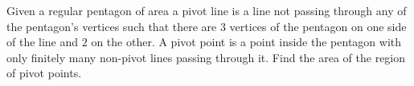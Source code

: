 Given a regular pentagon of area  a pivot line is a line not passing through any of the pentagon's vertices such that there are $3$ vertices of the pentagon on one side of the line and $2$ on the other. A pivot point is a point inside the pentagon with only finitely many non-pivot lines passing through it. Find the area of the region of pivot points.